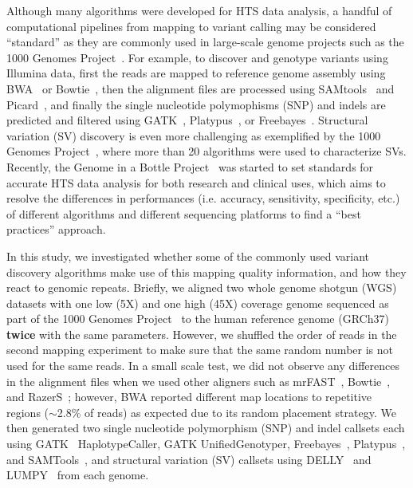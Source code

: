\documentclass[10pt,a4paper]{article}
\begin{document}
Although many algorithms were developed for HTS data analysis, a handful of computational pipelines from mapping to variant calling may be considered ``standard'' as they are commonly used in large-scale genome projects such as the 1000 Genomes Project~\cite{1000GP,1000GP2012}. For example, to discover and genotype variants using Illumina data, first the reads are mapped to reference genome assembly using BWA~\cite{Li2009a} or Bowtie~\cite{Langmead2009}, then the alignment files are processed using SAMtools~\cite{Li2009b} and Picard~\cite{picard}, and finally the single nucleotide polymophisms (SNP) and indels are predicted and filtered using GATK~\cite{DePristo2011}, Platypus~\cite{Rimmer2014}, or Freebayes~\cite{Garrison2012}. 
Structural variation (SV) discovery is even more challenging as exemplified by the 1000 Genomes Project~\cite{1000GP2012,1000GP,Mills2011}, where more than 20 algorithms were used to characterize SVs.
Recently, the Genome in a Bottle Project~\cite{Zook2014} was started to set standards for accurate HTS data analysis for both research and clinical uses,
which aims to resolve the differences in performances (i.e. accuracy, sensitivity, specificity, etc.) of different algorithms and different sequencing platforms
 to find a ``best practices'' approach.

In this study, we investigated whether some of the commonly used variant discovery algorithms
make use of this mapping quality information, and how they react to genomic repeats.
Briefly, 
we aligned two whole genome shotgun (WGS) datasets with one low (5X) and one high (45X) coverage genome
sequenced as part of the 1000 Genomes Project~\cite{1000GP2012} to the human reference genome (GRCh37) {\bf twice} with the same parameters. 
However, we shuffled the order of reads in the second mapping experiment to make sure that the same random number is not used for the same reads. 
In a small scale test, we did not observe any differences
in the alignment files when we used other aligners such as mrFAST~\cite{Alkan2009,Xin2013}, Bowtie~\cite{Langmead2009}, and RazerS~\cite{Weese2012}; however, 
BWA reported different map locations to repetitive regions ($\sim$2.8\% of reads) as expected due to its random placement strategy.
We then generated two single nucleotide polymorphism (SNP) and indel callsets each using GATK~\cite{DePristo2011} HaplotypeCaller, GATK UnifiedGenotyper, Freebayes~\cite{Garrison2012}, Platypus~\cite{Rimmer2014}, and SAMTools~\cite{Li2009b}, and structural variation (SV) callsets using DELLY~\cite{Rausch2012} and LUMPY~\cite{Layer2014} from each genome.
\end{document}
